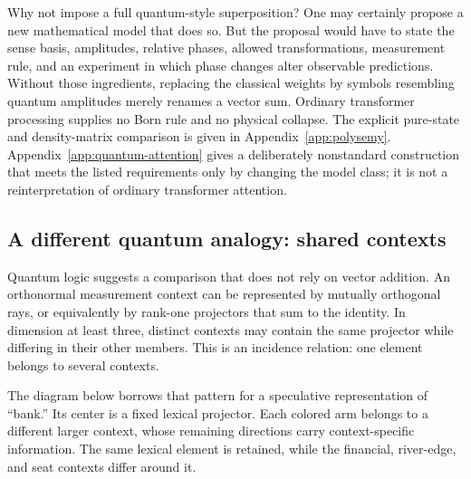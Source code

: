 \documentclass[
  aps,
  reprint,
  superscriptaddress,
  floatfix,
  nofootinbib,
  longbibliography
]{revtex4-2}
\begin{document}
Why not impose a full quantum-style superposition?  One may certainly propose
a new mathematical model that does so.  But the proposal would have to state
the sense basis, amplitudes, relative phases, allowed transformations,
measurement rule, and an experiment in which phase changes alter observable
predictions.  Without those ingredients, replacing the classical weights by
symbols resembling quantum amplitudes merely renames a vector sum.  Ordinary
transformer processing supplies no Born rule and no physical collapse.  The
explicit pure-state and density-matrix comparison is given in
Appendix~\ref{app:polysemy}.  Appendix~\ref{app:quantum-attention} gives a
deliberately nonstandard construction that meets the listed requirements only
by changing the model class; it is not a reinterpretation of ordinary
transformer attention.

\subsection{A different quantum analogy: shared contexts}

Quantum logic suggests a comparison that does not rely on vector addition.
An orthonormal measurement context can be represented by mutually orthogonal
rays, or equivalently by rank-one projectors that sum to the identity.  In
dimension at least three, distinct contexts may contain the same projector
while differing in their other members.  This is an incidence relation: one
element belongs to several contexts.

The diagram below borrows that pattern for a speculative representation of
``bank.''  Its center is a fixed lexical projector.  Each colored arm belongs
to a different larger context, whose remaining directions carry
context-specific information.  The same lexical element is retained, while
the financial, river-edge, and seat contexts differ around it.
\end{document}

